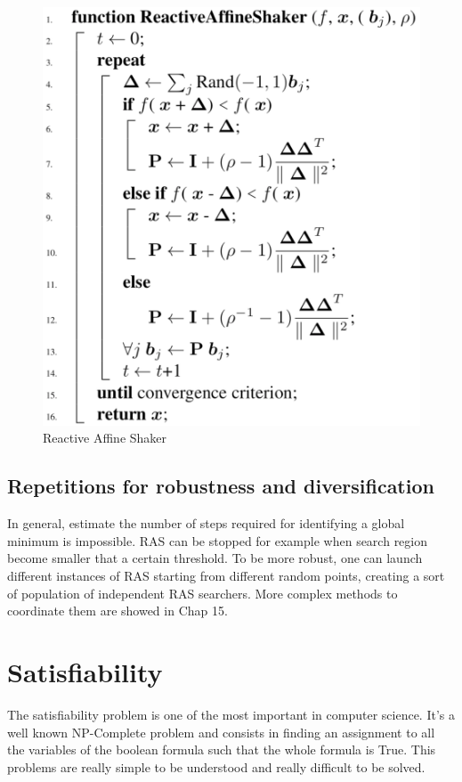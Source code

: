 \documentclass[10pt]{article}
\begin{document}
\begin{figure}[H]
\includegraphics[scale=0.25]{ras}
\caption{Reactive Affine Shaker}
\centering
\label{fig:ras}
\end{figure}

\subsection{Repetitions for robustness and diversification}

In general, estimate the number of steps required for identifying a global minimum is impossible. RAS can be stopped for example when search region become smaller that a certain threshold. To be more robust, one can launch different instances of RAS starting from different random points, creating a sort of population of independent RAS searchers. More complex methods to coordinate them are showed in Chap 15.




\section{Satisfiability}
The satisfiability problem is one of the most important in computer science. It's a well known NP-Complete problem and consists in finding an assignment to all the variables of the boolean formula such that the whole formula is True. This problems are really simple to be understood and really difficult to be solved.
\end{document}
